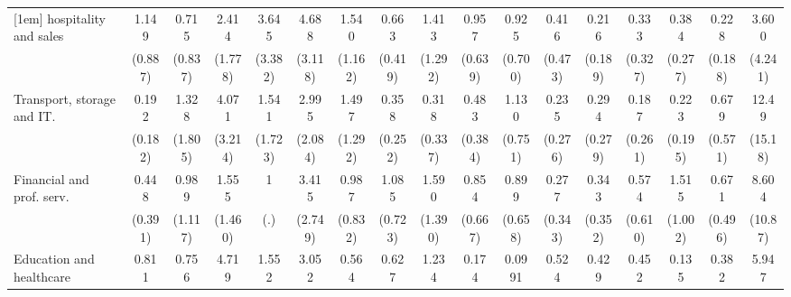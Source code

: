{\begin{tabular}{l*{16}{c}}
[1em]
hospitality and sales&       1.149         &       0.715         &       2.414         &       3.645         &       4.688\sym{*}  &       1.540         &       0.663         &       1.413         &       0.957         &       0.925         &       0.416         &       0.216         &       0.333         &       0.384         &       0.228         &       3.600         \\
                    &     (0.887)         &     (0.837)         &     (1.778)         &     (3.382)         &     (3.118)         &     (1.162)         &     (0.419)         &     (1.292)         &     (0.639)         &     (0.700)         &     (0.473)         &     (0.189)         &     (0.327)         &     (0.277)         &     (0.188)         &     (4.241)         \\
[1em]
Transport, storage and IT.&       0.192         &       1.328         &       4.071         &       1.541         &       2.995         &       1.497         &       0.358         &       0.318         &       0.483         &       1.130         &       0.235         &       0.294         &       0.187         &       0.223         &       0.679         &       12.49\sym{*}  \\
                    &     (0.182)         &     (1.805)         &     (3.214)         &     (1.723)         &     (2.084)         &     (1.292)         &     (0.252)         &     (0.337)         &     (0.384)         &     (0.751)         &     (0.276)         &     (0.279)         &     (0.261)         &     (0.195)         &     (0.571)         &     (15.18)         \\
[1em]
Financial and prof. serv.&       0.448         &       0.989         &       1.555         &           1         &       3.415         &       0.987         &       1.085         &       1.590         &       0.854         &       0.899         &       0.277         &       0.343         &       0.574         &       1.515         &       0.671         &       8.604         \\
                    &     (0.391)         &     (1.117)         &     (1.460)         &         (.)         &     (2.749)         &     (0.832)         &     (0.723)         &     (1.390)         &     (0.667)         &     (0.658)         &     (0.343)         &     (0.352)         &     (0.610)         &     (1.002)         &     (0.496)         &     (10.87)         \\
[1em]
Education and healthcare&       0.811         &       0.756         &       4.719         &       1.552         &       3.052         &       0.564         &       0.627         &       1.234         &       0.174         &      0.0991\sym{*}  &       0.524         &       0.429         &       0.452         &       0.135         &       0.382         &       5.947         \\

\end{tabular}}
